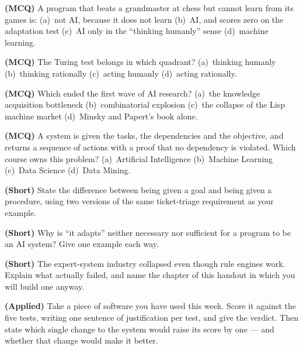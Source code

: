 \begin{reviewq}
  \item \textbf{(MCQ)} A program that beats a grandmaster at chess but cannot
        learn from its games is: (a)~not AI, because it does not learn (b)~AI, and
        scores zero on the adaptation test (c)~AI only in the ``thinking humanly''
        sense (d)~machine learning.
  \item \textbf{(MCQ)} The Turing test belongs in which quadrant?
        (a)~thinking humanly (b)~thinking rationally (c)~acting humanly
        (d)~acting rationally.
  \item \textbf{(MCQ)} Which ended the first wave of AI research?
        (a)~the knowledge acquisition bottleneck (b)~combinatorial explosion
        (c)~the collapse of the Lisp machine market (d)~Minsky and Papert's book
        alone.
  \item \textbf{(MCQ)} A system is given the tasks, the dependencies and the
        objective, and returns a sequence of actions with a proof that no
        dependency is violated. Which course owns this problem?
        (a)~Artificial Intelligence (b)~Machine Learning (c)~Data Science
        (d)~Data Mining.
  \item \textbf{(Short)} State the difference between being given a goal and being
        given a procedure, using two versions of the same ticket-triage
        requirement as your example.
  \item \textbf{(Short)} Why is ``it adapts'' neither necessary nor sufficient for
        a program to be an AI system? Give one example each way.
  \item \textbf{(Short)} The expert-system industry collapsed even though rule
        engines work. Explain what actually failed, and name the chapter of this
        handout in which you will build one anyway.
  \item \textbf{(Applied)} Take a piece of software you have used this week. Score
        it against the five tests, writing one sentence of justification per test,
        and give the verdict. Then state which single change to the system would
        raise its score by one --- and whether that change would make it better.
\end{reviewq}
